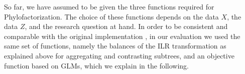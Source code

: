 So far, we have assumed to be given the three functions required for Phylofactorization.
The choice of these functions depends on the data $X$, the data $Z$, and the research question at hand.
In order to be consistent and comparable with the original implementation \cite{Washburne2017a},
in our evaluation we used the same set of functions,
namely the balances of the ILR transformation as explained above for aggregating and contrasting subtrees,
and an objective function based on \acfp{GLM}, which we explain in the following.



